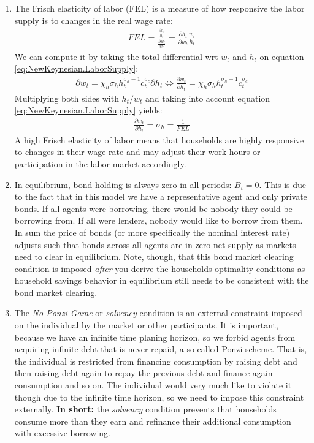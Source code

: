 \begin{enumerate}
\item The Frisch elasticity of labor (FEL) is a measure of how responsive the labor supply is to changes in the real wage rate:
\begin{align*}
FEL = \frac{\frac{\partial{h_t}}{h_t}}{\frac{\partial{w_t}}{w_t}} = \frac{\partial h_t}{\partial w_t} \frac{w_t}{h_t}
\end{align*}
We can compute it by taking the total differential wrt $w_t$ and $h_t$ on equation \eqref{eq:NewKeynesian.LaborSupply}:
\begin{align*}
\partial{w_t} = \chi_h \sigma_h h_t^{\sigma_h-1} c_t^{\sigma_c} \partial{h_t}
\Leftrightarrow
\frac{\partial w_t}{\partial h_t} = \chi_h \sigma_h h_t^{\sigma_h-1} c_t^{\sigma_c}
\end{align*}
Multiplying both sides with $h_t/w_t$ and taking into account equation \eqref{eq:NewKeynesian.LaborSupply} yields:
\begin{align*}
\frac{\partial w_t}{\partial h_t} = \sigma_h = \frac{1}{FEL}
\end{align*}
A high Frisch elasticity of labor means that households are highly responsive to changes in their wage rate and may adjust their work hours or participation in the labor market accordingly.

\item In equilibrium, bond-holding is always zero in all periods: $B_t=0$.
This is due to the fact that in this model we have a representative agent and only private bonds.
If all agents were borrowing, there would be nobody they could be borrowing from.
If all were lenders, nobody would like to borrow from them.
In sum the price of bonds (or more specifically the nominal interest rate) adjusts such
  that bonds across all agents are in zero net supply as markets need to clear in equilibrium.
Note, though, that this bond market clearing condition is imposed \emph{after} you derive the households optimality conditions
  as household savings behavior in equilibrium still needs to be consistent with the bond market clearing.

\item The \emph{No-Ponzi-Game} or \emph{solvency} condition is an external constraint imposed on the individual by the market or other participants.
It is important, because we have an infinite time planing horizon,
  so we forbid agents from acquiring infinite debt that is never repaid, a so-called Ponzi-scheme.
That is, the individual is restricted from financing consumption
  by raising debt and then raising debt again to repay the previous debt
  and finance again consumption and so on.
The individual would very much like to violate it though due to the infinite time horizon,
  so we need to impose this constraint externally.
\textbf{In short:} the \emph{solvency} condition prevents that households consume more than they earn
  and refinance their additional consumption with excessive borrowing.


\end{enumerate}
